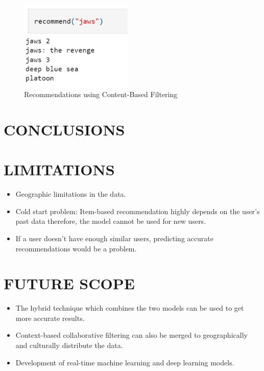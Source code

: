 \documentclass[a4paper,10pt]{article}
\begin{document}
\begin{itemize}
\begin{figure}[H]
        
        \centering
        \includegraphics[height=4.3cm]{figures/recommend(content).png}
        \caption{Recommendations using Content-Based Filtering}
        \label{recommend(content)}
\end{figure}


\end{itemize}

\section{CONCLUSIONS}

\section{LIMITATIONS}
\begin{itemize}
    \item Geographic limitations in the data.
    \item Cold start problem: Item-based recommendation highly depends on the user’s past data therefore, the model cannot be used for new users.

    \item If a user doesn't have enough similar users, predicting accurate recommendations would be a problem.
\end{itemize}


\section{FUTURE SCOPE}
\begin{itemize}
    \item The hybrid technique which combines the two models can be used to get more accurate results.
    \item Context-based collaborative filtering can also be merged to geographically and culturally distribute the data.
    \item Development of real-time machine learning and deep learning models.
\end{itemize}
\fontsize{8}{9}\selectfont







\clearpage
\end{document}
